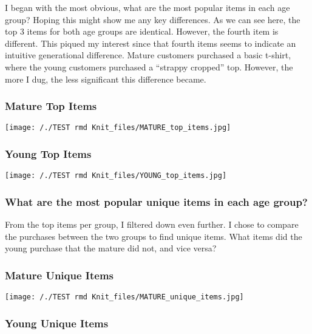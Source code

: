 \documentclass[
]{article}
\begin{document}
I began with the most obvious, what are the most popular items in each
age group? Hoping this might show me any key differences. As we can see
here, the top 3 items for both age groups are identical. However, the
fourth item is different. This piqued my interest since that fourth
items seems to indicate an intuitive generational difference. Mature
customers purchased a basic t-shirt, where the young customers purchased
a ``strappy cropped'' top. However, the more I dug, the less significant
this difference became.

\hypertarget{mature-top-items}{%
\subsubsection{Mature Top Items}\label{mature-top-items}}

\texttt{[image: /./TEST rmd Knit\_files/MATURE\_top\_items.jpg]}

\hypertarget{young-top-items}{%
\subsubsection{Young Top Items}\label{young-top-items}}

\texttt{[image: /./TEST rmd Knit\_files/YOUNG\_top\_items.jpg]}

\hypertarget{what-are-the-most-popular-unique-items-in-each-age-group}{%
\subsubsection{What are the most popular unique items in each age
group?}\label{what-are-the-most-popular-unique-items-in-each-age-group}}

From the top items per group, I filtered down even further. I chose to
compare the purchases between the two groups to find unique items. What
items did the young purchase that the mature did not, and vice versa?

\hypertarget{mature-unique-items}{%
\subsubsection{Mature Unique Items}\label{mature-unique-items}}

\texttt{[image: /./TEST rmd Knit\_files/MATURE\_unique\_items.jpg]}

\hypertarget{young-unique-items}{%
\subsubsection{Young Unique Items}\label{young-unique-items}}
\end{document}
